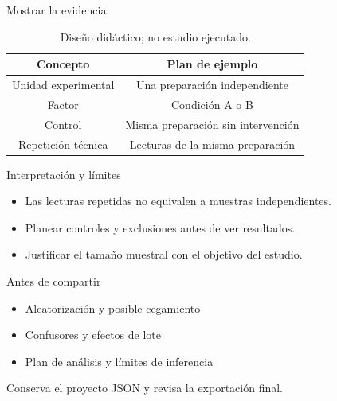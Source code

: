 \documentclass[aspectratio=169,11pt]{beamer}
\begin{document}
\begin{frame}{Mostrar la evidencia}
  \transdissolve[duration=0.25]
  \begin{table}
    \centering
    \caption{Diseño didáctico; no estudio ejecutado.}
    \begin{tabular}{cc}
      \toprule
      \textbf{Concepto} & \textbf{Plan de ejemplo} \\
      \midrule
      Unidad experimental & Una preparación independiente \\
      Factor & Condición A o B \\
      Control & Misma preparación sin intervención \\
      Repetición técnica & Lecturas de la misma preparación \\
      \bottomrule
    \end{tabular}
  \end{table}
\end{frame}

\begin{frame}{Interpretación y límites}
  \transdissolve[duration=0.25]
  \begin{itemize}
    \item Las lecturas repetidas no equivalen a muestras independientes.
    \item Planear controles y exclusiones antes de ver resultados.
    \item Justificar el tamaño muestral con el objetivo del estudio.
  \end{itemize}
\end{frame}

\begin{frame}{Antes de compartir}
  \transdissolve[duration=0.25]
  \begin{itemize}
    \item Aleatorización y posible cegamiento
    \item Confusores y efectos de lote
    \item Plan de análisis y límites de inferencia
  \end{itemize}
  \medskip

  {\small Conserva el proyecto JSON y revisa la exportación final.}
\end{frame}
\end{document}
